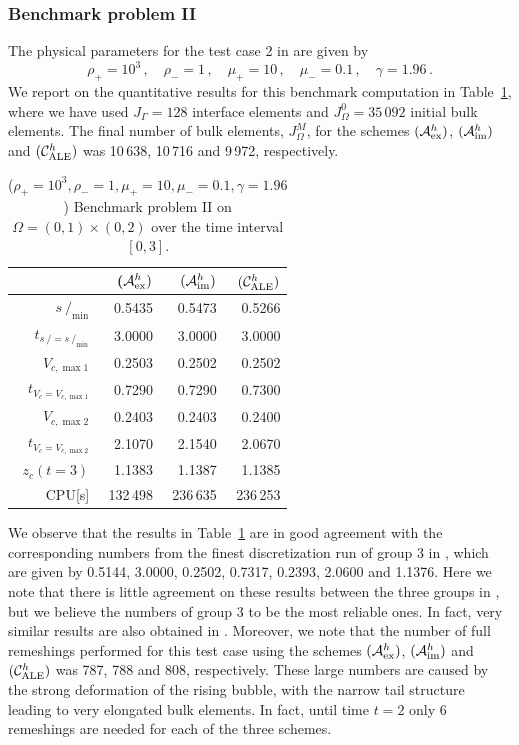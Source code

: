 \documentclass[a4paper,12pt,onecolumn]{article}
\newcommand{\strikes}{\mbox{$s\!\!\!\!\:/$}}
\newcommand{\schemeAex}{{\mathcal{A}^h_{\rm ex}}}
\newcommand{\schemeAim}{{\mathcal{A}^h_{\rm im}}}
\newcommand{\schemeALE}{{\mathcal{C}^h_{\rm ALE}}}
\begin{document}
\subsubsection{Benchmark problem II}

The physical parameters for the test case 2 in \cite[Table~I]{HysingTKPBGT09}
are given by
\begin{equation} \label{eq:Hysing2}
\rho_+ = 10^3\,,\quad \rho_- = 1\,,\quad \mu_+ = 10\,,\quad \mu_- = 0.1\,,\quad
\gamma = 1.96\,.
\end{equation}
We report on the quantitative results for this benchmark computation in
Table~\ref{tab:risingbubbleII}, where we have used
$J_\Gamma=128$ interface elements and $J_\Omega^0=35\,092$ initial
bulk elements. The final number of bulk elements, $J_\Omega^M$, for the schemes
$(\schemeAex)$, $(\schemeAim)$ and $(\schemeALE)$ was 10\,638, 10\,716 and
9\,972, respectively.
\begin{table}
\center
\hspace*{-3.25cm}
\begin{tabular}{rrrr}
\hline
& ($\schemeAex)$ & $(\schemeAim)$ & $(\schemeALE)$ \\
\hline
$\strikes_{\min}$                & 0.5435 & 0.5473 & 0.5266 \\
$t_{\strikes = \strikes_{\min}}$ & 3.0000 & 3.0000 & 3.0000 \\
$V_{c,\max 1}$                   & 0.2503 & 0.2502 & 0.2502 \\
$t_{V_c = V_{c,\max 1}}$         & 0.7290 & 0.7290 & 0.7300 \\
$V_{c,\max 2}$                   & 0.2403 & 0.2403 & 0.2400 \\
$t_{V_c = V_{c,\max 2}}$         & 2.1070 & 2.1540 & 2.0670 \\
$z_c(t=3)$                       & 1.1383 & 1.1387 & 1.1385 \\
CPU[s]                           & 132\,498 & 236\,635 & 236\,253 \\
\hline
\end{tabular}
\hspace*{-3.25cm}
\caption{($\rho_+ = 10^3,\rho_- = 1,\mu_+ = 10,\mu_- =0.1,\gamma = 1.96$)
Benchmark problem II on $\Omega = (0,1) \times (0,2)$ over the time
interval $[0,3]$.}
\label{tab:risingbubbleII}
\end{table}%
We observe that the results in Table~\ref{tab:risingbubbleII}
are in good agreement with the corresponding numbers from the finest
discretization run of group 3 in \cite{HysingTKPBGT09}, which are given by
0.5144, 3.0000, 0.2502, 0.7317, 0.2393, 2.0600 and 1.1376. Here we note that
there is little agreement on these results between the three groups in
\cite{HysingTKPBGT09}, but we believe the numbers of group 3 to be the most
reliable ones. In fact, very similar results are also obtained in
\cite[Tables~5 and 6]{fluidfbp}. Moreover, we note that the number of full
remeshings performed for this test case using the schemes $(\schemeAex)$,
$(\schemeAim)$ and $(\schemeALE)$ was 787, 788 and 808, respectively.
These large numbers are caused by the strong deformation of the rising bubble,
with the narrow tail structure leading to very elongated bulk elements. In
fact, until time $t=2$ only 6 remeshings are needed for each of the three
schemes.
\end{document}

